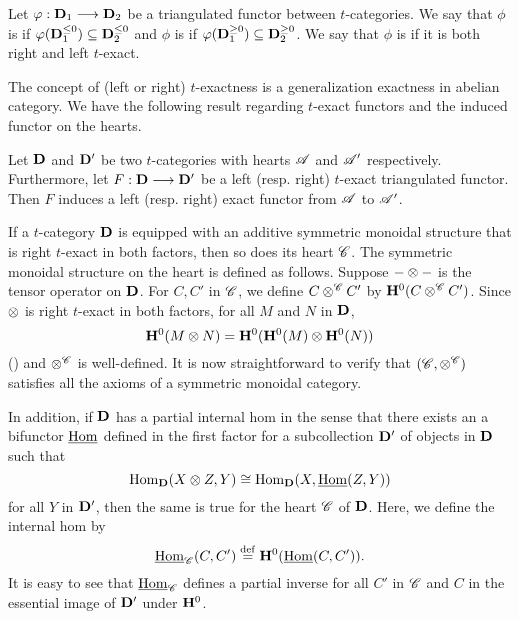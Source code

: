 \begin{defn}
Let $\varphi: \mathbf{D}_1 \longrightarrow \mathbf{D}_2$ be a triangulated functor between
$t$-categories. We say that $\phi$ is  if 
$\varphi(\mathbf{D}_1^{\leq 0}) \subseteq \mathbf{D}_2^{\leq 0}$ and $\phi$ is 
 if $\varphi(\mathbf{D}_1^{\geq 0}) \subseteq 
\mathbf{D}_2^{\geq 0}$. We say that $\phi$ is  
if it is both right and left $t$-exact.
\end{defn}

The concept of (left or right) $t$-exactness is a generalization 
exactness in abelian category. We have the following result
regarding $t$-exact functors and the induced functor on the
hearts.

\begin{prop}\label{prop_t_exact_implies_exact}
Let $\mathbf{D}$ and $\mathbf{D}'$ be two $t$-categories with hearts 
$\mathscr{A}$ and $\mathscr{A}'$ respectively. Furthermore, let $F: 
\mathbf{D} \longrightarrow \mathbf{D}'$ be a left (resp. right) $t$-exact triangulated 
functor. Then $F$ induces a left (resp. right) exact 
functor from $\mathscr{A}$ to $\mathscr{A}'$.
\end{prop}

If a $t$-category $\mathbf{D}$ is equipped with an additive symmetric 
monoidal structure that is right $t$-exact in both factors, then 
so does its heart $\mathscr{C}$. The symmetric monoidal structure on
the heart is defined as follows. Suppose $- \otimes -$ is the 
tensor operator on $\mathbf{D}$. For $C, C'$ in $\mathscr{C}$, we define $C 
\otimes^{\mathscr{C}} C'$ by $\mathbf{H}^0(C \otimes^{\mathscr{C}} C')$. 
Since $\otimes$ is right $t$-exact in both factors, for all $M$ 
and $N$ in $\mathbf{D}$,
\[
\mathbf{H}^0(M \otimes N) = \mathbf{H}^0(\mathbf{H}^0(M) \otimes \mathbf{H}^0(N))
\]
(\cite[5.10]{DegModHom}) and $\otimes^{\mathscr{C}}$ is well-defined.
It is now straightforward to verify that $(\mathscr{C}, 
\otimes^{\mathscr{C}})$ satisfies all the axioms of a symmetric 
monoidal category. 

In addition, if $\mathbf{D}$ has a partial internal hom in the sense
that there exists an a bifunctor $\underline{\mathrm{Hom}}$ defined in the first 
factor for a subcollection $\mathbf{D}'$ of objects in $\mathbf{D}$ such
that
\[
\mathrm{Hom}_{\mathbf{D}}(X \otimes Z, Y) \cong 
   \mathrm{Hom}_{\mathbf{D}}(X, \underline{\mathrm{Hom}}(Z, Y))
\]
for all $Y$ in $\mathbf{D}'$, then the same is true for the heart 
$\mathscr{C}$ of $\mathbf{D}$. Here, we define the internal hom by
\[
\underline{\mathrm{Hom}}_{\mathscr{C}}(C, C') \stackrel{\mathrm{def}}{=} \mathbf{H}^0(\underline{\mathrm{Hom}}(C, C')).
\]
It is easy to see that $\underline{\mathrm{Hom}}_{\mathscr{C}}$ defines a partial inverse
for all $C'$ in $\mathscr{C}$ and $C$ in the essential image of 
$\mathbf{D}'$ under $\mathbf{H}^0$.

